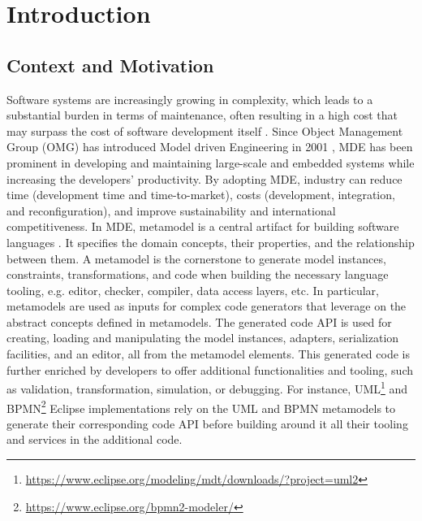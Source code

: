 \chapter{Introduction}



\section{Context and Motivation}
Software systems are increasingly growing in complexity, which leads to a substantial burden in terms of maintenance, often resulting in a high cost that may surpass the cost of software development itself \cite{https://doi.org/10.1049/sfw2.12075}.
Since Object Management Group (OMG) has introduced Model driven Engineering in 2001 \cite{brambilla2017model}, MDE has been prominent in developing and maintaining large-scale and embedded systems while increasing the developers' productivity. By adopting MDE, industry can reduce time (development time and time-to-market), costs (development, integration, and reconfiguration), and improve sustainability and international competitiveness.%
In MDE, metamodel is a central artifact for building software languages \cite{cabot2012object}. It specifies the domain concepts, their properties, and the relationship between them.
A metamodel is the cornerstone to generate model instances, constraints, transformations, and code when building the necessary language tooling, e.g. editor, checker, compiler, data access layers, etc. 
In particular, metamodels are used as inputs for complex code generators that leverage on the abstract concepts defined in metamodels. The generated code API is used for creating, loading and manipulating the model instances, adapters, serialization facilities, and an editor, all from the metamodel elements.
This generated code is further enriched by developers to offer additional functionalities and tooling, such as validation, transformation, simulation, or debugging.
For instance, UML\footnote{\url{https://www.eclipse.org/modeling/mdt/downloads/?project=uml2}}  and BPMN\footnote{\url{https://www.eclipse.org/bpmn2-modeler/}} Eclipse implementations rely on the UML and BPMN metamodels to generate their corresponding code API before building around it all their tooling and services in the additional code.
